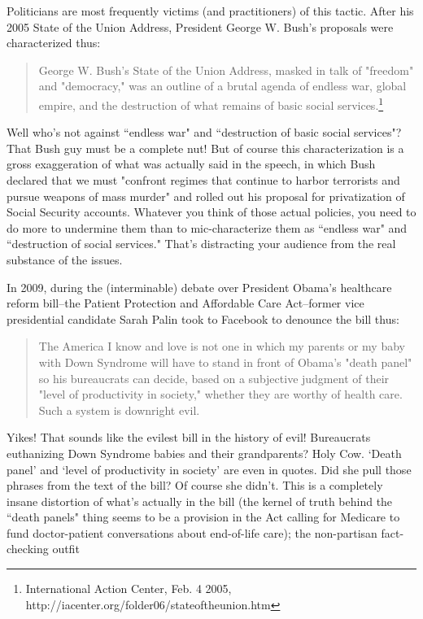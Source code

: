 Politicians are most frequently victims (and practitioners) of this tactic. After his 2005 State of the
Union Address, President George W. Bush's proposals were characterized thus:

\begin{quote}George W. Bush's State of the Union Address, masked in talk of "freedom" and
"democracy," was an outline of a brutal agenda of endless war, global empire, and the
destruction of what remains of basic social 
services.\footnote{International Action Center, Feb. 4 2005, http://iacenter.org/folder06/stateoftheunion.htm}
\end{quote}

Well who's not against ``endless war" and ``destruction of basic social services"? That Bush guy
must be a complete nut! But of course this characterization is a gross exaggeration of what was
actually said in the speech, in which Bush declared that we must "confront regimes that continue
to harbor terrorists and pursue weapons of mass murder" and rolled out his proposal for
privatization of Social Security accounts. Whatever you think of those actual policies, you need to
do more to undermine them than to mic-characterize them as ``endless war" and ``destruction of
social services." That's distracting your audience from the real substance of the issues.

In 2009, during the (interminable) debate over President Obama's healthcare reform bill--the
Patient Protection and Affordable Care Act--former vice presidential candidate Sarah Palin took
to Facebook to denounce the bill thus:

\begin{quote}The America I know and love is not one in which my parents or my baby with Down
Syndrome will have to stand in front of Obama's "death panel" so his bureaucrats can
decide, based on a subjective judgment of their "level of productivity in society," whether
they are worthy of health care. Such a system is downright evil.
\end{quote}

Yikes! That sounds like the evilest bill in the history of evil! Bureaucrats euthanizing Down
Syndrome babies and their grandparents? Holy Cow. `Death panel' and `level of productivity in
society' are even in quotes. Did she pull those phrases from the text of the bill?
Of course she didn't. This is a completely insane distortion of what's actually in the bill (the kernel
of truth behind the ``death panels" thing seems to be a provision in the Act calling for Medicare to
fund doctor-patient conversations about end-of-life care); the non-partisan fact-checking outfit

